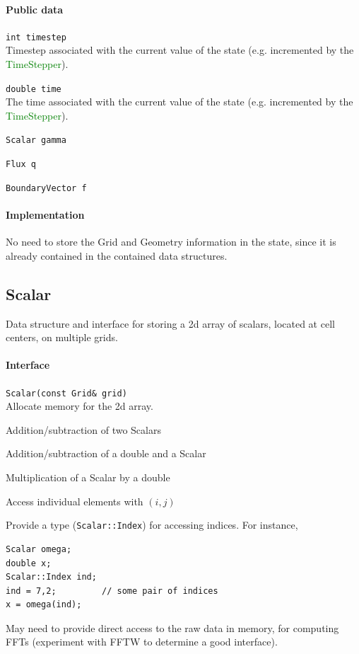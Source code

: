 \documentclass[11pt]{article}
\def\class#1{\textcolor{green}{\ttfamily\small #1}} %
\let\code\lstinline
\begin{document}
\paragraph{Public data}
\begin{description}
	\item \code|int timestep|\\
		Timestep associated with the current value of the state (e.g. incremented by the \class{TimeStepper}).
	\item \code|double time|\\
		The time associated with the current value of the state (e.g. incremented by the \class{TimeStepper}).
	\item \code|Scalar gamma|\\
	\item \code|Flux q|\\
	\item \code|BoundaryVector f|
\end{description}

\paragraph{Implementation}
No need to store the Grid and Geometry information in the state, since it is already contained in the contained data structures.

\subsection{Scalar}
Data structure and interface for storing a 2d array of scalars, located at cell centers, on multiple grids.

\paragraph{Interface}
\begin{description}
	\item \code|Scalar(const Grid& grid)|\\
	Allocate memory for the 2d array.
	\item Addition/subtraction of two Scalars
	\item Addition/subtraction of a double and a Scalar
	\item Multiplication of a Scalar by a double
	\item Access individual elements with $(i,j)$
	\item Provide a type (\code|Scalar::Index|) for accessing indices.  For instance,
	\begin{lstlisting}
Scalar omega;
double x;
Scalar::Index ind;
ind = 7,2;         // some pair of indices
x = omega(ind);
	\end{lstlisting}
	\item May need to provide direct access to the raw data in memory, for computing FFTs (experiment with FFTW to determine a good interface).
\end{description}
\end{document}
